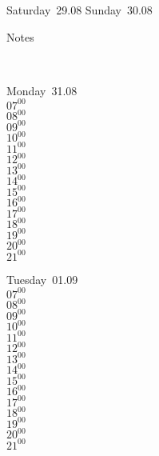 \documentclass[11pt,a4paper]{book}\usepackage[]{graphicx}\usepackage[]{color}
\begin{document}
{{{{{{{{{\begin{tcolorbox}
\end{tcolorbox} 
\begin{tcolorbox}[height=(\textheight-10mm)/6]
Saturday~29.08
\tcblower
Sunday~30.08
\end{tcolorbox} %
\begin{tcolorbox}[height=(\textheight-10mm)/6,sidebyside=false]
Notes
\end{tcolorbox}
\clearpage
\vspace{2 mm}\\
\begin{tcolorbox}
Monday~31.08\\
{ 
  $07^{00}$\\
$08^{00}$\\
$09^{00}$\\
$10^{00}$\\
$11^{00}$\\
$12^{00}$\\
$13^{00}$\\
$14^{00}$\\
$15^{00}$\\
$16^{00}$\\
$17^{00}$\\
$18^{00}$\\
$19^{00}$\\
$20^{00}$\\
$21^{00}$}\\

\end{tcolorbox}
\begin{tcolorbox}
Tuesday~01.09\\
{ 
  $07^{00}$\\
$08^{00}$\\
$09^{00}$\\
$10^{00}$\\
$11^{00}$\\
$12^{00}$\\
$13^{00}$\\
$14^{00}$\\
$15^{00}$\\
$16^{00}$\\
$17^{00}$\\
$18^{00}$\\
$19^{00}$\\
$20^{00}$\\
$21^{00}$}\\


\end{tcolorbox}}}}}}}}}}
\end{document}
